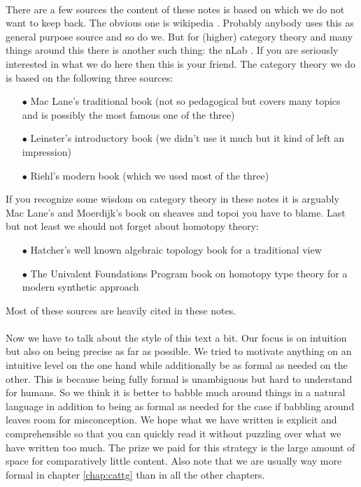 \\
There are a few sources the content of these notes is based on which we do not want to keep back. The obvious one is wikipedia \cite{wiki-pedia0en}. Probably anybody uses this as general purpose source and so do we. But for (higher) category theory
 and many things around this there is another such thing: the nLab \cite{wiki-nlab0000}. If you are seriously interested in what we do here then this is your friend. The category theory we do is based on the following three sources:
\begin{enumerate}
\item[$\bullet$]
Mac Lane's traditional book \cite{e837ef86} (not so pedagogical but covers many topics and is possibly the most famous one of the three)
\item[$\bullet$]
Leinster's introductory book \cite{dc6f686f} (we didn't use it much but it kind of left an impression)
\item[$\bullet$]
Riehl's modern book \cite{52fbba46} (which we used most of the three)
\end{enumerate}
If you recognize some wisdom on category theory in these notes it is arguably Mac Lane's and Moerdijk's book on sheaves and topoi \cite{c55c71e8} you have to blame. Last but not least we should not forget about homotopy theory:
\begin{enumerate}
\item[$\bullet$]
Hatcher's well known algebraic topology book \cite{8b5861fc} for a traditional view
\item[$\bullet$]
The Univalent Foundations Program book on homotopy type theory \cite{1ba1603e} for a modern synthetic approach
\end{enumerate}
Most of these sources are heavily cited in these notes.
\\\\
Now we have to talk about the style of this text a bit. Our focus is on intuition but also on being precise as far as possible. We tried to motivate anything on an intuitive level on the one hand while additionally be as formal as needed on the other. This is because being fully formal is unambiguous but hard to understand for humans. So we think it is better to babble much around things in a natural language in addition to being as formal as needed for the case if babbling around leaves room for misconception. We hope what we have written is explicit and comprehensible so that you can quickly read it without puzzling over what we have written too much. The prize we paid for this strategy is the large amount of space for comparatively little content. Also note that we are usually way more formal in chapter \ref{chap:cattg} than in all the other chapters.
